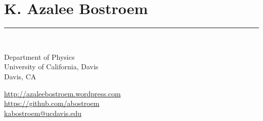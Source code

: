 \documentclass{res}
\begin{document}
 

\section{{\LARGE \bf{K. Azalee Bostroem}}}
{\rule{\linewidth}{0.5mm}} \\
\begin{minipage}{0.55\textwidth}
\vspace{0.25cm}
Department of Physics \\
University of California, Davis \\
Davis, CA
\end{minipage}
\begin{minipage}{0.45\textwidth}
\color{blue}\url{http://azaleebostroem.wordpress.com}\\
\color{blue}\url{https://github.com/abostroem} \\
\color{blue}\url{kabostroem@ucdavis.edu}
\end{minipage}
\end{document}
